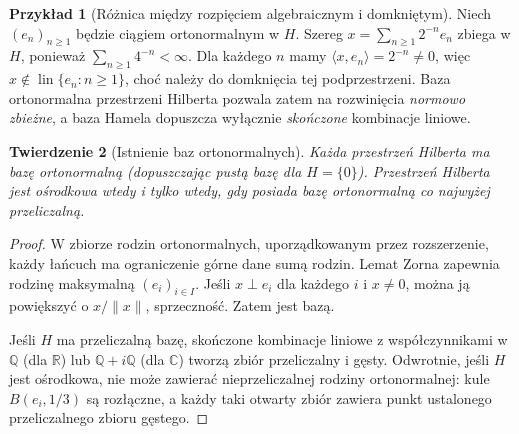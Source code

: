 \documentclass[11pt,a4paper]{article}
\numberwithin{equation}{section}
\theoremstyle{plain}
\newtheorem{twierdzenie}{Twierdzenie}[section]
\theoremstyle{definition}
\newtheorem{przyklad}[twierdzenie]{Przykład}
\theoremstyle{remark}
\newcommand{\R}{\mathbb R}
\newcommand{\C}{\mathbb C}
\DeclareMathOperator{\lin}{lin}
\begin{document}
\begin{przyklad}[Różnica między rozpięciem algebraicznym i domkniętym]
\label{ex:hilbert-series-not-hamel13}
Niech $(e_n)_{n\ge1}$ będzie ciągiem ortonormalnym w $H$.
Szereg $x=\sum_{n\ge1}2^{-n}e_n$ zbiega w $H$, ponieważ
$\sum_{n\ge1}4^{-n}<\infty$. Dla każdego $n$ mamy
$\langle x,e_n\rangle=2^{-n}\ne0$, więc
$x\notin\lin\{e_n:n\ge1\}$, choć należy do domknięcia
tej podprzestrzeni. Baza ortonormalna przestrzeni Hilberta pozwala zatem na rozwinięcia
\emph{normowo zbieżne}, a baza Hamela dopuszcza wyłącznie
\emph{skończone} kombinacje liniowe.
\end{przyklad}

\begin{twierdzenie}[Istnienie baz ortonormalnych]
\label{thm:hilbert-basis13}
Każda przestrzeń Hilberta ma bazę ortonormalną (dopuszczając pustą
bazę dla $H=\{0\}$). Przestrzeń Hilberta jest ośrodkowa wtedy i tylko
wtedy, gdy posiada bazę ortonormalną co najwyżej przeliczalną.
\end{twierdzenie}
\begin{proof}
W zbiorze rodzin ortonormalnych, uporządkowanym przez rozszerzenie,
każdy łańcuch ma ograniczenie górne dane sumą rodzin.
Lemat Zorna zapewnia rodzinę maksymalną $(e_i)_{i\in I}$.
Jeśli $x\perp e_i$ dla każdego $i$ i $x\ne0$, można ją powiększyć
o $x/\|x\|$, sprzeczność. Zatem jest bazą.

Jeśli $H$ ma przeliczalną bazę, skończone kombinacje liniowe z
współczynnikami w $\mathbb Q$ (dla $\R$) lub
$\mathbb Q+i\mathbb Q$ (dla $\C$) tworzą zbiór przeliczalny i gęsty.
Odwrotnie, jeśli $H$ jest ośrodkowa, nie może zawierać
nieprzeliczalnej rodziny ortonormalnej: kule
$B(e_i,1/3)$ są rozłączne, a każdy taki otwarty zbiór zawiera
punkt ustalonego przeliczalnego zbioru gęstego.
\end{proof}
\end{document}
